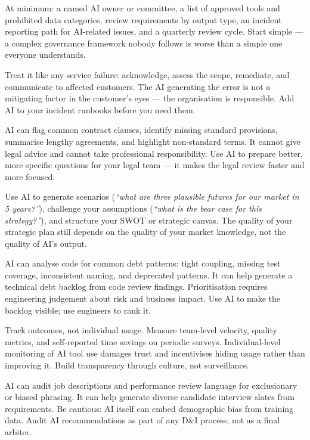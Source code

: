 {At minimum: a named AI owner or committee, a list of approved tools and prohibited
data categories, review requirements by output type, an incident reporting path for
AI-related issues, and a quarterly review cycle.
Start simple --- a complex governance framework nobody follows is worse than a
simple one everyone understands.}

{Treat it like any service failure: acknowledge, assess the scope, remediate, and
communicate to affected customers.
The AI generating the error is not a mitigating factor in the customer's eyes ---
the organisation is responsible.
Add AI to your incident runbooks before you need them.}

{AI can flag common contract clauses, identify missing standard provisions, summarise
lengthy agreements, and highlight non-standard terms.
It cannot give legal advice and cannot take professional responsibility.
Use AI to prepare better, more specific questions for your legal team --- it makes the
legal review faster and more focused.}

{Use AI to generate scenarios (\textit{``what are three plausible futures for our market
in 5 years?''}), challenge your assumptions (\textit{``what is the bear case for this
strategy?''}), and structure your SWOT or strategic canvas.
The quality of your strategic plan still depends on the quality of your market
knowledge, not the quality of AI's output.}

{AI can analyse code for common debt patterns: tight coupling, missing test coverage,
inconsistent naming, and deprecated patterns.
It can help generate a technical debt backlog from code review findings.
Prioritisation requires engineering judgement about risk and business impact.
Use AI to make the backlog visible; use engineers to rank it.}

{Track outcomes, not individual usage.
Measure team-level velocity, quality metrics, and self-reported time savings on
periodic surveys.
Individual-level monitoring of AI tool use damages trust and incentivises hiding usage
rather than improving it.
Build transparency through culture, not surveillance.}

{AI can audit job descriptions and performance review language for exclusionary or
biased phrasing.
It can help generate diverse candidate interview slates from requirements.
Be cautious: AI itself can embed demographic bias from training data.
Audit AI recommendations as part of any D\&I process, not as a final arbiter.}

